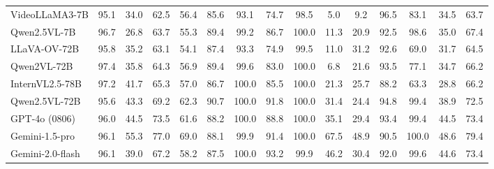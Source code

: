 \begin{table*}[!t]
{\begin{tabular}{@{}lcccccccccccccc@{}}
VideoLLaMA3-7B & 95.1 & 34.0 & 62.5 & 56.4 & 85.6 & 93.1 & 74.7 & 98.5 & 5.0 & 9.2 & 96.5 & 83.1 & 34.5 & 63.7 \\
Qwen2.5VL-7B & 96.7 & 26.8 & 63.7 & 55.3 & 89.4 & 99.2 & 86.7 & 100.0 & 11.3 & 20.9 & 92.5 & 98.6 & 35.0 & 67.4 \\
LLaVA-OV-72B & 95.8 & 35.2 & 63.1 & 54.1 & 87.4 & 93.3 & 74.9 & 99.5 & 11.0 & 31.2 & 92.6 & 69.0 & 31.7 & 64.5 \\
Qwen2VL-72B & 97.4 & 35.8 & 64.3 & 56.9 & 89.4 & 99.6 & 83.0 & 100.0 & 6.8 & 21.6 & 93.5 & 77.1 & 34.7 & 66.2 \\
InternVL2.5-78B & 97.2 & 41.7 & 65.3 & 57.0 & 86.7 & 100.0 & 85.5 & 100.0 & 21.3 & 25.7 & 88.2 & 63.3 & 28.8 & 66.2 \\
Qwen2.5VL-72B & 95.6 & 43.3 & 69.2 & 62.3 & 90.7 & 100.0 & 91.8 & 100.0 & 31.4 & 24.4 & 94.8 & 99.4 & 38.9 & 72.5 \\
GPT-4o (0806) & 96.0 & 44.5 & 73.5 & 61.6 & 88.2 & 100.0 & 88.8 & 100.0 & 35.1 & 29.4 & 93.4 & 99.4 & 44.5 & 73.4 \\
Gemini-1.5-pro & 96.1 & 55.3 & 77.0 & 69.0 & 88.1 & 99.9 & 91.4 & 100.0 & 67.5 & 48.9 & 90.5 & 100.0 & 48.6 & 79.4 \\
Gemini-2.0-flash & 96.1 & 39.0 & 67.2 & 58.2 & 87.5 & 100.0 & 93.2 & 99.9 & 46.2 & 30.4 & 92.0 & 99.6 & 44.6 & 73.4 \\ \bottomrule
\end{tabular}%
}
\end{table*}


